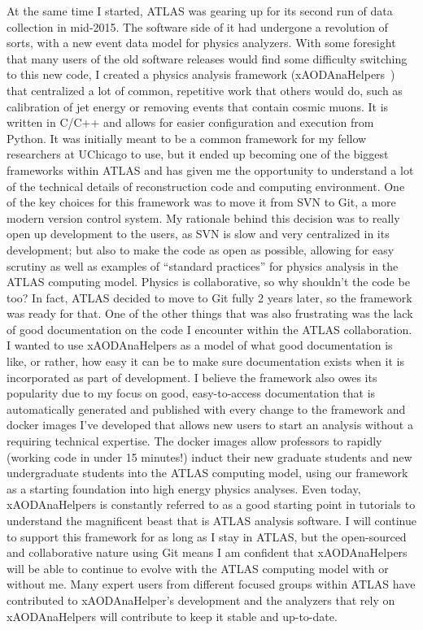 \documentclass[letterpaper, 11pt]{article}
\begin{document}
At the same time I started, ATLAS was gearing up for its second run of data collection in mid-2015. The software side of it had undergone a revolution of sorts, with a new event data model for physics analyzers. With some foresight that many users of the old software releases would find some difficulty switching to this new code, I created a physics analysis framework (xAODAnaHelpers~) that centralized a lot of common, repetitive work that others would do, such as calibration of jet energy or removing events that contain cosmic muons. It is written in C/C++ and allows for easier configuration and execution from Python. It was initially meant to be a common framework for my fellow researchers at UChicago to use, but it ended up becoming one of the biggest frameworks within ATLAS and has given me the opportunity to understand a lot of the technical details of reconstruction code and computing environment. One of the key choices for this framework was to move it from SVN to Git, a more modern version control system. My rationale behind this decision was to really open up development to the users, as SVN is slow and very centralized in its development; but also to make the code as open as possible, allowing for easy scrutiny as well as examples of ``standard practices'' for physics analysis in the ATLAS computing model. Physics is collaborative, so why shouldn't the code be too? In fact, ATLAS decided to move to Git fully 2 years later, so the framework was ready for that. One of the other things that was also frustrating was the lack of good documentation on the code I encounter within the ATLAS collaboration. I wanted to use xAODAnaHelpers as a model of what good documentation is like, or rather, how easy it can be to make sure documentation exists when it is incorporated as part of development. I believe the framework also owes its popularity due to my focus on good, easy-to-access documentation that is automatically generated and published with every change to the framework and docker images I've developed that allows new users to start an analysis without a requiring technical expertise. The docker images allow professors to rapidly (working code in under 15 minutes!) induct their new graduate students and new undergraduate students into the ATLAS computing model, using our framework as a starting foundation into high energy physics analyses. Even today, xAODAnaHelpers is constantly referred to as a good starting point in tutorials to understand the magnificent beast that is ATLAS analysis software. I will continue to support this framework for as long as I stay in ATLAS, but the open-sourced and collaborative nature using Git means I am confident that xAODAnaHelpers will be able to continue to evolve with the ATLAS computing model with or without me. Many expert users from different focused groups within ATLAS have contributed to xAODAnaHelper's development and the analyzers that rely on xAODAnaHelpers will contribute to keep it stable and up-to-date.
\end{document}
